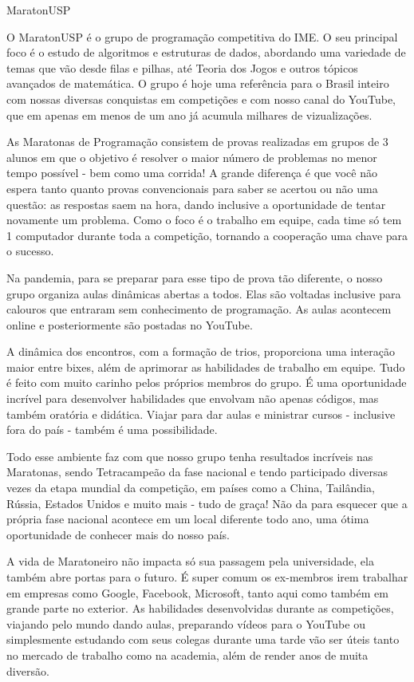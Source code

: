 \begin{subsecao}{MaratonUSP}

O MaratonUSP é o grupo de programação competitiva do IME. O seu principal foco é o estudo de algoritmos e estruturas de dados, abordando uma variedade de temas que vão desde filas e pilhas, até Teoria dos Jogos e outros tópicos avançados de matemática. O grupo é hoje uma referência para o Brasil inteiro com nossas diversas conquistas em competições e com nosso canal do YouTube, que em apenas em menos de um ano já acumula milhares de vizualizações.

As Maratonas de Programação consistem de provas realizadas em grupos de 3 alunos em que o objetivo é resolver o maior número de problemas no menor tempo possível - bem como uma corrida! A grande diferença é que você não espera tanto quanto provas convencionais para saber se acertou ou não uma questão: as respostas saem na hora, dando inclusive a oportunidade de tentar novamente um problema. Como o foco é o  trabalho em equipe, cada time só tem 1 computador durante toda a competição, tornando a cooperação uma chave para o sucesso.

Na pandemia, para se preparar para esse tipo de prova tão diferente, o nosso grupo organiza aulas dinâmicas abertas a todos. Elas são voltadas inclusive para calouros que entraram sem conhecimento de programação. As aulas acontecem online e posteriormente são postadas no YouTube.

A dinâmica dos encontros, com a formação de trios, proporciona uma interação maior entre bixes, além de aprimorar as habilidades de trabalho em equipe. Tudo é feito com muito carinho pelos próprios membros do grupo. É uma oportunidade incrível para desenvolver habilidades que envolvam não apenas códigos, mas também oratória e didática. Viajar para dar aulas e ministrar cursos - inclusive fora do país - também é uma possibilidade.

Todo esse ambiente faz com que nosso grupo tenha resultados incríveis nas Maratonas, sendo Tetracampeão da fase nacional e tendo participado diversas vezes da etapa mundial da competição, em países como a China, Tailândia, Rússia, Estados Unidos e muito mais - tudo de graça! Não da para esquecer que a própria fase nacional acontece em um local diferente todo ano, uma ótima oportunidade de conhecer mais do nosso país.

A vida de Maratoneiro não impacta só sua passagem pela universidade, ela também abre portas para o futuro. É super comum os ex-membros irem trabalhar em empresas como Google, Facebook, Microsoft, tanto aqui como também em grande parte no exterior. As habilidades desenvolvidas durante as competições, viajando pelo mundo dando aulas, preparando vídeos para o YouTube ou simplesmente estudando com seus colegas durante uma tarde vão ser úteis tanto no mercado de trabalho como na academia, além de render anos de muita diversão.


\end{subsecao}
